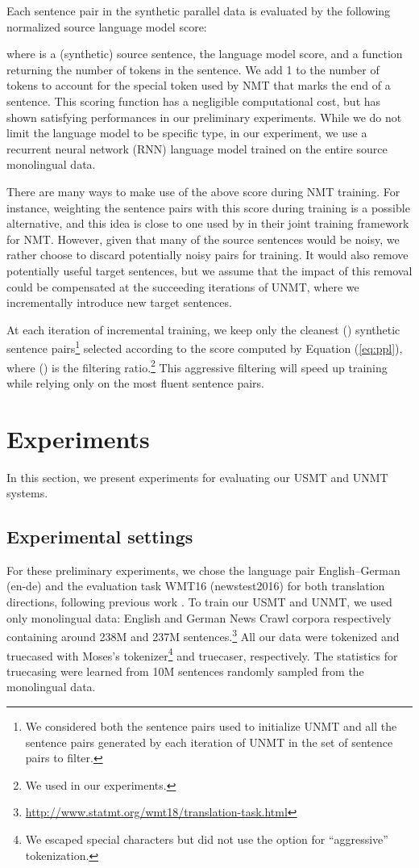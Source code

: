 \documentclass[11pt,a4paper]{article}
\newcommand{\Eq}[1]{{Equation (\ref{eq:#1})}}
\newcommand{\moses}{Moses}
\begin{document}
Each sentence pair in the synthetic parallel data is evaluated by the following normalized source language model score:

where  is a (synthetic) source sentence,  the language model score, and  a function returning the number of tokens in the sentence. We add 1 to the number of tokens to account for the special token used by NMT that marks the end of a sentence. This scoring function has a negligible computational cost, but has shown satisfying performances in our preliminary experiments.  While we do not limit the language model to be specific type, in our experiment, we use a recurrent neural network (RNN) language model trained on the entire source monolingual data. 

There are many ways to make use of the above score during NMT training. For instance, weighting the sentence pairs with this score during training is a possible alternative, and this idea is close to one used by \citet{ijcai2017-555} in their joint training framework for NMT. However, given that many of the source sentences would be noisy, we rather choose to discard potentially noisy pairs for training. It would also remove potentially useful target sentences, but we assume that the impact of this removal could be compensated at the succeeding iterations of UNMT, where we incrementally introduce new target sentences.

At each iteration  of incremental training, we keep only the cleanest () synthetic sentence pairs\footnote{We considered both the sentence pairs used to initialize UNMT and all the sentence pairs generated by each iteration of UNMT in the set of sentence pairs to filter.} selected according to the score computed by \Eq{ppl}, where  () is the filtering ratio.\footnote{We used  in our experiments.} This aggressive filtering will speed up training while relying only on the most fluent sentence pairs.

\section{Experiments}
\label{section:exp}
In this section, we present experiments for evaluating our USMT and UNMT systems.
\subsection{Experimental settings}
\label{section:expset}
For these preliminary experiments, we chose the language pair English--German (en-de) and the evaluation task WMT16 (newstest2016) for both translation directions, following previous work \citep{artetxe2018unsupervised,DBLP:journals/corr/abs-1804-07755}. To train our USMT and UNMT, we used only monolingual data: English and German News Crawl corpora respectively containing around 238M and 237M sentences.\footnote{\url{http://www.statmt.org/wmt18/translation-task.html}}
All our data were tokenized and truecased with {\moses}'s tokenizer\footnote{We escaped special characters but did not use the option for ``aggressive'' tokenization.} and truecaser, respectively. The statistics for truecasing were learned from 10M sentences randomly sampled from the monolingual data.
\end{document}
